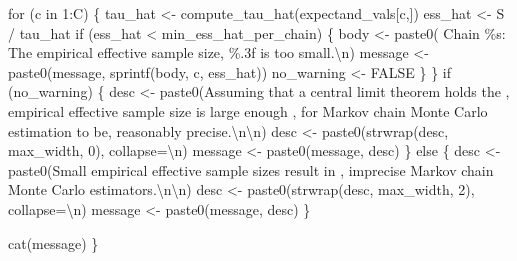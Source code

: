 \documentclass[
  letterpaper,
  DIV=11,
  numbers=noendperiod]{scrartcl}
\newenvironment{Shaded}{\begin{snugshade}}{\end{snugshade}}
\newcommand{\CharTok}[1]{\textcolor[rgb]{0.13,0.47,0.30}{#1}}
\newcommand{\ControlFlowTok}[1]{\textcolor[rgb]{0.00,0.23,0.31}{#1}}
\newcommand{\DecValTok}[1]{\textcolor[rgb]{0.68,0.00,0.00}{#1}}
\newcommand{\KeywordTok}[1]{\textcolor[rgb]{0.00,0.23,0.31}{#1}}
\newcommand{\NormalTok}[1]{\textcolor[rgb]{0.00,0.23,0.31}{#1}}
\newcommand{\OperatorTok}[1]{\textcolor[rgb]{0.37,0.37,0.37}{#1}}
\newcommand{\SpecialCharTok}[1]{\textcolor[rgb]{0.37,0.37,0.37}{#1}}
\newcommand{\StringTok}[1]{\textcolor[rgb]{0.13,0.47,0.30}{#1}}
\begin{document}
\begin{Shaded}
\begin{Highlighting}[]
  \ControlFlowTok{for}\NormalTok{ (c }\KeywordTok{in} \DecValTok{1}\NormalTok{:C) \{}
\NormalTok{    tau\_hat }\OperatorTok{\textless{}{-}}\NormalTok{ compute\_tau\_hat(expectand\_vals[c,])}
\NormalTok{    ess\_hat }\OperatorTok{\textless{}{-}}\NormalTok{ S }\OperatorTok{/}\NormalTok{ tau\_hat}
    \ControlFlowTok{if}\NormalTok{ (ess\_hat }\OperatorTok{\textless{}}\NormalTok{ min\_ess\_hat\_per\_chain) \{}
\NormalTok{      body }\OperatorTok{\textless{}{-}}\NormalTok{ paste0(}\StringTok{\textquotesingle{}  Chain }\SpecialCharTok{\%s}\StringTok{: The empirical effective sample size\textquotesingle{}}\NormalTok{,}
                     \StringTok{\textquotesingle{}}\SpecialCharTok{\%.3f}\StringTok{ is too small.}\CharTok{\textbackslash{}n}\StringTok{\textquotesingle{}}\NormalTok{)}
\NormalTok{      message }\OperatorTok{\textless{}{-}}\NormalTok{ paste0(message, sprintf(body, c, ess\_hat))}
\NormalTok{      no\_warning }\OperatorTok{\textless{}{-}}\NormalTok{ FALSE}
\NormalTok{    \}}
\NormalTok{  \}}
  \ControlFlowTok{if}\NormalTok{ (no\_warning) \{}
\NormalTok{    desc }\OperatorTok{\textless{}{-}}\NormalTok{ paste0(}\StringTok{\textquotesingle{}Assuming that a central limit theorem holds the \textquotesingle{}}\NormalTok{,}
                   \StringTok{\textquotesingle{}empirical effective sample size is large enough \textquotesingle{}}\NormalTok{,}
                   \StringTok{\textquotesingle{}for Markov chain Monte Carlo estimation to be\textquotesingle{}}\NormalTok{,}
                   \StringTok{\textquotesingle{}reasonably precise.}\CharTok{\textbackslash{}n\textbackslash{}n}\StringTok{\textquotesingle{}}\NormalTok{)}
\NormalTok{    desc }\OperatorTok{\textless{}{-}}\NormalTok{ paste0(strwrap(desc, max\_width, }\DecValTok{0}\NormalTok{), collapse}\OperatorTok{=}\StringTok{\textquotesingle{}}\CharTok{\textbackslash{}n}\StringTok{\textquotesingle{}}\NormalTok{)}
\NormalTok{    message }\OperatorTok{\textless{}{-}}\NormalTok{ paste0(message, desc)}
\NormalTok{  \} }\ControlFlowTok{else}\NormalTok{ \{}
\NormalTok{    desc }\OperatorTok{\textless{}{-}}\NormalTok{ paste0(}\StringTok{\textquotesingle{}Small empirical effective sample sizes result in \textquotesingle{}}\NormalTok{,}
                   \StringTok{\textquotesingle{}imprecise Markov chain Monte Carlo estimators.}\CharTok{\textbackslash{}n\textbackslash{}n}\StringTok{\textquotesingle{}}\NormalTok{)}
\NormalTok{    desc }\OperatorTok{\textless{}{-}}\NormalTok{ paste0(strwrap(desc, max\_width, }\DecValTok{2}\NormalTok{), collapse}\OperatorTok{=}\StringTok{\textquotesingle{}}\CharTok{\textbackslash{}n}\StringTok{\textquotesingle{}}\NormalTok{)}
\NormalTok{    message }\OperatorTok{\textless{}{-}}\NormalTok{ paste0(message, desc)}
\NormalTok{  \}}
  
\NormalTok{  cat(message)}
\NormalTok{\}}
\end{Highlighting}
\end{Shaded}
\end{document}
